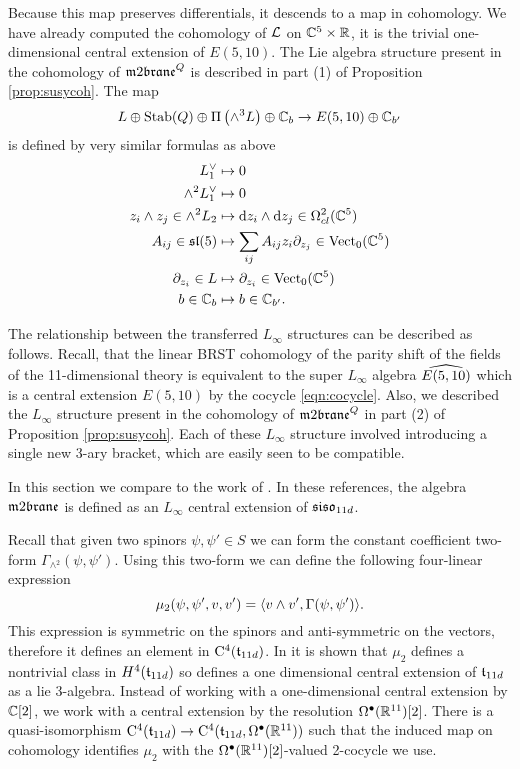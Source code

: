 \parsec[]

Because this map preserves differentials, it descends to a map in cohomology. 
We have already computed the cohomology of $\cL$ on $\CC^5 \times \RR$, it is the trivial one-dimensional central extension of $E (5,10)$. 
The Lie algebra structure present in the cohomology of $\m2^Q$ is described in part (1) of Proposition \ref{prop:susycoh}. 
The map
\[
L \oplus {\rm Stab}(Q) \oplus \Pi \left(\wedge^3 L \right) \oplus \CC_b \to E (5,10) \oplus \CC_{b'}
\]
is defined by very similar formulas as above
\begin{align*}
 L^\vee_1 & \mapsto 0 \\
 \wedge^2 L^\vee_1 & \mapsto 0 \\
z_i \wedge z_j \in \wedge^2 L_2 & \mapsto \d z_i \wedge \d z_j \in \Omega^{2}_{cl} (\CC^5) \\
A_{ij} \in \lie{sl}(5) & \mapsto \sum_{ij} A_{ij} z_i \partial_{z_j} \in \Vect_0(\CC^5) \\ \partial_{z_i} \in L & \mapsto
\partial_{z_i} \in \Vect_0(\CC^5) \\
b \in \CC_b & \mapsto b \in \CC_{b'} .
\end{align*}

The relationship between the transferred $L_\infty$ structures can be described as follows. 
Recall, that the linear BRST cohomology of the parity shift of the fields of the 11-dimensional theory is equivalent to the super $L_\infty$ 
algebra $\Hat{E(5,10)}$ which is a central extension $E(5,10)$ by the cocycle \eqref{eqn:cocycle}.
Also, we described the $L_\infty$ structure present in the cohomology of $\m2^Q$ in part (2) of Proposition \ref{prop:susycoh}. 
Each of these $L_\infty$ structure involved introducing a single new $3$-ary bracket, which are easily seen to be compatible. 

\parsec[]

In this section we compare to the work of .
In these references, the algebra $\m2$ is defined as an $L_\infty$  
central extension of $\lie{siso}_{11d}$. 

Recall that given two spinors $\psi, \psi' \in S$ we can form the constant coefficient two-form $\Gamma_{\wedge^2} (\psi, \psi')$. 
Using this two-form we can define the following four-linear expression
\[
\mu_2 (\psi, \psi',v,v') = \<v \wedge v', \Gamma(\psi, \psi')\> .
\]
This expression is symmetric on the spinors and anti-symmetric on the vectors, therefore it defines an element in $\clie^4(\ft_{11d})$. 
In \cite{fiorenza2015super} it is shown that $\mu_2$ defines a nontrivial class in $H^4(\ft_{11d})$ so defines a one dimensional central extension of $\ft_{11d}$ as a lie 3-algebra. Instead of working with a one-dimensional central extension by $\C[2]$, we work with a central extension by the resolution $\Omega^\bullet(\R^{11})[2]$. There is a quasi-isomorphism $\clie^4(\ft_{11d})\to \clie^4(\ft_{11d}, \Omega^\bullet (\R^{11}))$ such that the induced map on cohomology identifies $\mu_2$ with the $\Omega^\bullet(\R^{11})[2]$-valued 2-cocycle we use. 

